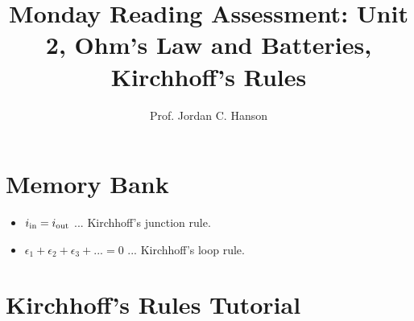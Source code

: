 \documentclass{article}
\begin{document}
\title{Monday Reading Assessment: Unit 2, Ohm's Law and Batteries, Kirchhoff's Rules}
\author{Prof. Jordan C. Hanson}

\maketitle

\section{Memory Bank}

\begin{itemize}
<<<<<<< HEAD
\item $i_{\rm in} = i_{\rm out}$ ... Kirchhoff's junction rule.
\item $\epsilon_1 + \epsilon_2 + \epsilon_3 + ... = 0$ ... Kirchhoff's loop rule.
\end{itemize}

\section{Kirchhoff's Rules Tutorial}
\end{document}
